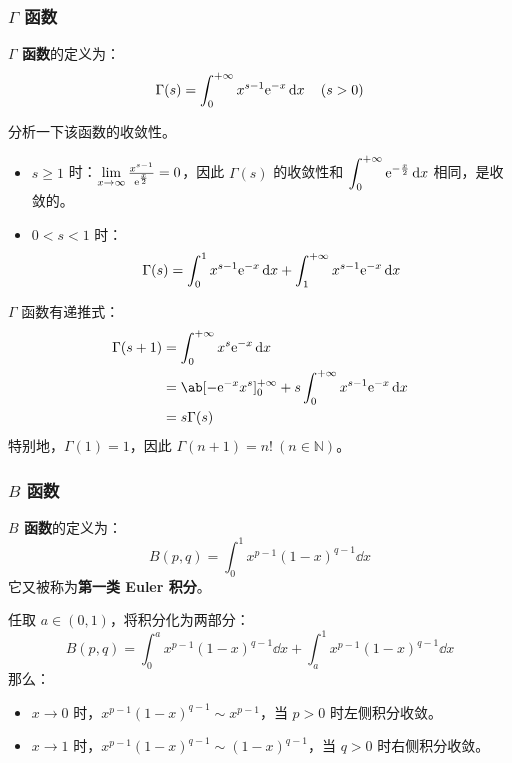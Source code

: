 \subsubsection{$\Gamma$ 函数}

\begin{definition}[$\Gamma$ 函数]
	\textbf{$\Gamma$ 函数}的定义为：
	$$
	\Gamma(s) = \int_{0}^{+\infty} x^{s - 1} \mathrm{e}^{-x} \dd{x} \quad (s > 0)
	$$
\end{definition}

分析一下该函数的收敛性。
\begin{itemize}
	\item $s \ge 1$ 时：$\lim\limits_{x \to \infty} \frac{x^{s - 1}}{\mathrm{e}^{\frac{x}{2}}} = 0$，因此 $\Gamma(s)$ 的收敛性和 $\displaystyle \int_{0}^{+\infty} \mathrm{e}^{-\frac{x}{2}} \dd{x}$ 相同，是收敛的。
	
	\item $0 < s < 1$ 时：
	$$
	\Gamma(s) = \int_{0}^{1} x^{s - 1} \mathrm{e}^{-x} \dd{x} + \int_{1}^{+\infty} x^{s - 1} \mathrm{e}^{-x} \dd{x}
	$$
\end{itemize}

$\Gamma$ 函数有递推式：
$$
\begin{aligned}
	\Gamma(s + 1) & = \int_{0}^{+ \infty} x^{s} \E^{-x} \dd{x} \\
	& = \ab[-\E^{-x} x^{s}]_{0}^{+\infty} + s \int_{0}^{+\infty} x^{s - 1} \E^{-x} \dd{x} \\
	& = s \Gamma(s)
\end{aligned}
$$
特别地，$\Gamma(1) = 1$，因此 $\Gamma(n + 1) = n! \ (n \in \mathbb{N})$。

\subsubsection{$B$ 函数}

\begin{definition}[$B$ 函数]
	\textbf{$B$ 函数}的定义为：
	$$
	B(p, q) = \int_{0}^{1} x^{p - 1} (1 - x)^{q - 1} \dd{x}
	$$
	它又被称为\textbf{第一类 Euler 积分}。
\end{definition}

任取 $a \in (0, 1)$，将积分化为两部分：
$$
B(p, q) = \int_{0}^{a} x^{p - 1} (1 - x)^{q - 1} \dd{x} + \int_{a}^{1} x^{p - 1} (1 - x)^{q - 1} \dd{x}
$$
那么：
\begin{itemize}
	\item $x \to 0$ 时，$x^{p - 1} (1 - x)^{q - 1} \sim x^{p - 1}$，当 $p > 0$ 时左侧积分收敛。
	\item $x \to 1$ 时，$x^{p - 1} (1 - x)^{q - 1} \sim (1 - x)^{q - 1}$，当 $q > 0$ 时右侧积分收敛。
\end{itemize}

